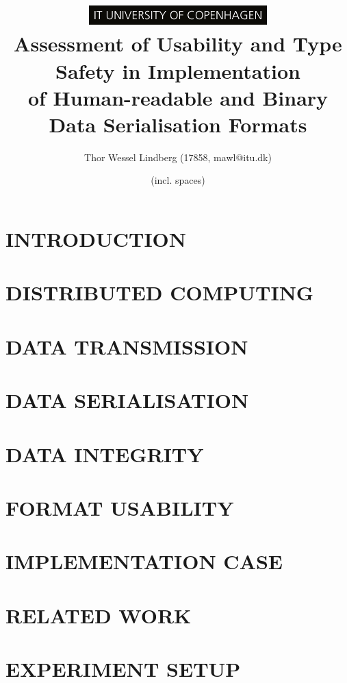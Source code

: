 \documentclass[10pt, twocolumn, letterpaper]{article}
\title{
    \includegraphics[height=0.75cm]{logo.jpg} \\
    \vspace{1.25cm}
    \Large \textbf{Assessment of Usability and Type Safety in Implementation} \\
    \Large \textbf{of Human-readable and Binary Data Serialisation Formats} \\
}
\author{Thor Wessel Lindberg (17858, mawl@itu.dk)}
\date{\charactercount{report} (incl. spaces)}
\begin{document}
\maketitle



\section{INTRODUCTION}


\section{DISTRIBUTED COMPUTING}


\section{DATA TRANSMISSION} %


\section{DATA SERIALISATION} %


\section{DATA INTEGRITY} %


\section{FORMAT USABILITY} %


\section{IMPLEMENTATION CASE} %


\section{RELATED WORK}


\section{EXPERIMENT SETUP}

\end{document}
